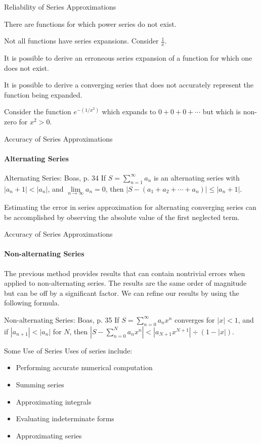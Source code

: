 \documentclass{beamer}
\begin{document}
\begin{frame}{Reliability of Series Approximations}
	\begin{alertblock}{}
	There are functions for which power series do not exist.
	\end{alertblock}
	Not all functions have series expansions.  Consider $\frac{1}{x}$.
	\begin{alertblock}{}
	It is possible to derive an erroneous series expansion of a function for which one does not exist.
	\end{alertblock}
	\begin{alertblock}{}
	It is possible to derive a converging series that does not accurately represent the function being expanded.
	\end{alertblock}
	Consider the function $e^{-(1/x^2)}$ which expands to $0+0+0+\cdots$ but which is non-zero for $x^2>0$.
\end{frame}
  
\begin{frame}{Accuracy of Series Approximations}
	\framesubtitle{Alternating Series}
	\begin{block}{Alternating Series: Boas, p. 34}
	If $S=\sum\limits_{n=1}^\infty a_n$ is an alternating series with $|a_n+1|<|a_n|$, and $\lim\limits_{n\to\infty}a_n=0$, then $|S-(a_1+a_2+\cdots +a_n)|\leq |a_n+1|$.
	\end{block}
	Estimating the error in series approximation for alternating converging series can be accomplished by observing the absolute value of the first neglected term.
\end{frame}
  
\begin{frame}{Accuracy of Series Approximations}
	\framesubtitle{Non-alternating Series}
	The previous method provides results that can contain nontrivial errors when applied to non-alternating series.  The results are the same order of magnitude but can be off by a significant factor.  We can refine our results by using the following formula.
	\begin{block}{Non-alternating Series: Boas, p. 35}
	If $S=\sum\limits_{n=0}^\infty a_n x^n$ converges for $|x|<1$, and if $|a_{n+1}|<|a_n|$ for $N$, then $\left\lvert S-\sum\limits_{n=0}^N a_n x^n \right\rvert<|a_{N+1}x^{N+1}|\div(1-|x|)$.
	\end{block}
\end{frame}
  
\begin{frame}{Some Use of Series}
	Uses of series include:
	\begin{itemize}
		\item Performing accurate numerical computation
		\item Summing series
		\item Approximating integrals
		\item Evaluating indeterminate forms
		\item Approximating series
	\end{itemize}
\end{frame}
  
\end{document}
